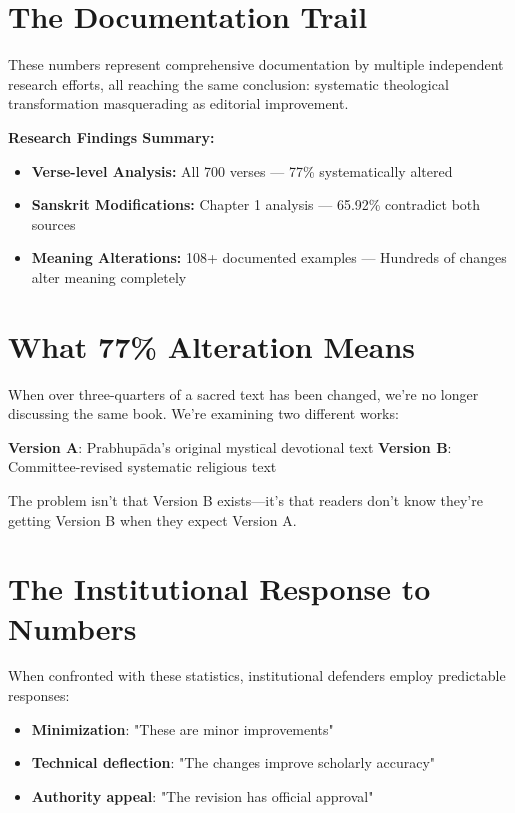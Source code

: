 \documentclass[11pt,twoside]{book}
\begin{document}
\section*{The Documentation Trail}
\label{sec:org24ab42a}

These numbers represent comprehensive documentation by multiple independent research efforts, all reaching the same conclusion: systematic theological transformation masquerading as editorial improvement.

\textbf{\textbf{Research Findings Summary:}}

\begin{itemize}
\item \textbf{\textbf{Verse-level Analysis:}} All 700 verses — 77\% systematically altered
\item \textbf{\textbf{Sanskrit Modifications:}} Chapter 1 analysis — 65.92\% contradict both sources
\item \textbf{\textbf{Meaning Alterations:}} 108+ documented examples — Hundreds of changes alter meaning completely
\end{itemize}
\section*{What 77\% Alteration Means}
\label{sec:orgcdfcec9}

When over three-quarters of a sacred text has been changed, we're no longer discussing the same book. We're examining two different works:

\textbf{\textbf{Version A}}: Prabhupāda's original mystical devotional text
\textbf{\textbf{Version B}}: Committee-revised systematic religious text

The problem isn't that Version B exists—it's that readers don't know they're getting Version B when they expect Version A.
\section*{The Institutional Response to Numbers}
\label{sec:org182b50a}

When confronted with these statistics, institutional defenders employ predictable responses:

\begin{itemize}
\item \textbf{\textbf{Minimization}}: "These are minor improvements"
\item \textbf{\textbf{Technical deflection}}: "The changes improve scholarly accuracy"
\item \textbf{\textbf{Authority appeal}}: "The revision has official approval"
\end{itemize}
\end{document}

